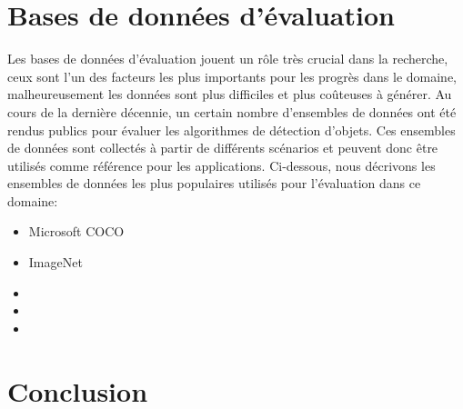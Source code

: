 \section{Bases de données d'évaluation} 
Les bases de données d'évaluation jouent un rôle très crucial dans la recherche, ceux sont l'un des facteurs les plus importants pour les progrès dans le domaine, malheureusement les données sont plus difficiles et plus coûteuses à générer. Au cours de la dernière décennie, un certain nombre d'ensembles de données ont été rendus publics pour évaluer les algorithmes de détection d'objets. Ces ensembles de données sont collectés à partir de différents scénarios et peuvent donc être utilisés comme référence pour les applications. Ci-dessous, nous décrivons les ensembles de données  les plus populaires utilisés pour l'évaluation dans ce domaine:

\begin{itemize}
\item Microsoft COCO \cite{db1}

\item ImageNet \cite{db2}
\item 
\item 
\item 
\end{itemize}



\section{Conclusion} 

